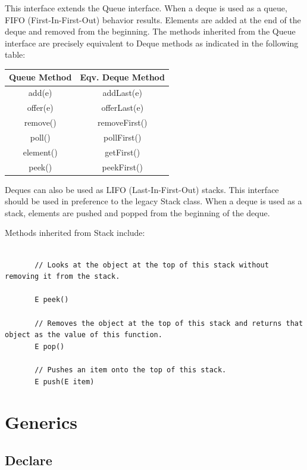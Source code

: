 \documentclass{scrartcl}
\begin{document}
    \bigskip
    \bigskip

    This interface extends the Queue interface. When a deque is used as a queue, FIFO (First-In-First-Out) behavior results. Elements are added at the end of the deque and removed from the beginning. The methods inherited from the Queue interface are precisely equivalent to Deque methods as indicated in the following table:

    \bigskip

    \begin{tabular}{|c|c|}
        \hline
        Queue Method& Eqv. Deque Method \\
        \hline
        add(e) &	addLast(e)  \\
        \hline
        offer(e) &	offerLast(e)  \\
        \hline
        remove() & 	removeFirst() \\
        \hline
        poll() &	pollFirst()  \\
        \hline
        element() &	getFirst()  \\
        \hline
        peek() &	peekFirst()  \\
        \hline
    \end{tabular}

    \bigskip

    Deques can also be used as LIFO (Last-In-First-Out) stacks. This interface should be used in preference to the legacy Stack class. When a deque is used as a stack, elements are pushed and popped from the beginning of the deque.

    Methods inherited from Stack include:

    \begin{lstlisting}

       // Looks at the object at the top of this stack without removing it from the stack.

       E peek()

       // Removes the object at the top of this stack and returns that object as the value of this function.
       E pop()

       // Pushes an item onto the top of this stack.
       E push(E item)

    \end{lstlisting}


\section{Generics}
\subsection{Declare}
\end{document}
